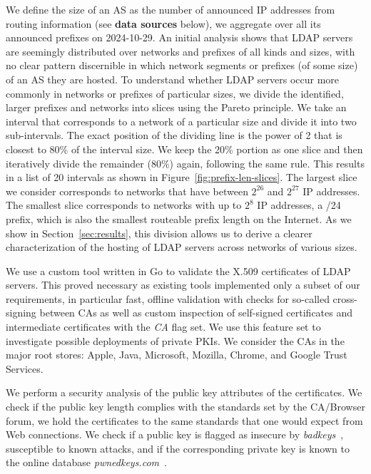 We define the size of an \gls{AS} as the number of announced IP addresses from routing information (see \textbf{data sources} below), \ie we aggregate over all its announced prefixes on 2024-10-29. An initial analysis shows that \gls{LDAP} servers are seemingly distributed over networks and prefixes of all kinds and sizes, with no clear pattern discernible in which network segments or prefixes (of some size) of an \gls{AS} they are hosted. To understand whether \gls{LDAP} servers occur more commonly in networks or prefixes of particular sizes, we divide the identified, larger prefixes and networks into slices using the Pareto principle. We take an interval that corresponds to a network of a particular size and divide it into two sub-intervals. The exact position of the dividing line is the power of 2 that is closest to 80\% of the interval size. We keep the 20\% portion as one slice and then iteratively divide the remainder (80\%) again, following the same rule. This results in a list of 20 intervals as shown in Figure~\ref{fig:prefix-len-slices}. The largest slice we consider corresponds to networks that have between $2^{26}$ and $2^{27}$ IP addresses. The smallest slice corresponds to networks with up to $2^8$ IP addresses, \ie a /24 prefix, which is also the smallest routeable prefix length on the Internet. As we show in Section~\ref{sec:results}, this division allows us to derive a clearer characterization of the hosting of \gls{LDAP} servers across networks of various sizes.

We use a custom tool written in Go to validate the X.509 certificates of \gls{LDAP} servers. This proved necessary as existing tools implemented only a subset of our requirements, in particular fast, offline validation with checks for so-called cross-signing between \glspl{CA} as well as custom inspection of self-signed certificates and intermediate certificates with the \textit{CA} flag set. We use this feature set to investigate possible deployments of private PKIs. We consider the \glspl{CA} in the major root stores: Apple, Java, Microsoft, Mozilla, Chrome, and Google Trust Services.

We perform a security analysis of the public key attributes of the certificates. We check if the public key length complies with the standards set by the CA/Browser forum, \ie we hold the certificates to the same standards that one would expect from Web connections. We check if a public key is flagged as insecure by \textit{badkeys}~\cite{badkeys}, \eg susceptible to known attacks, and if the corresponding private key is known to the online database \textit{pwnedkeys.com}~\cite{pwnedkeys}. 

